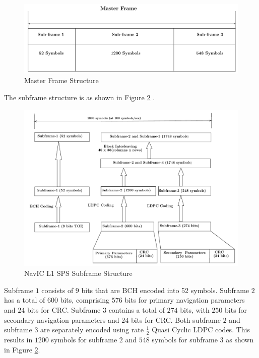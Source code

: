 \documentclass[conference]{IEEEtran}
\begin{document}
\begin{figure}[ht]
\centering
\includegraphics[width=1\columnwidth]{figs/master_frame}
\centering
\caption{Master Frame Structure}
\label{fig:master_frame}
\end{figure}

The subframe structure is as shown in Figure \ref{fig: SPS_Structure} \cite{b2}.
\begin{figure}[ht]
\centering
\includegraphics[width= 1\columnwidth]{figs/spsframe}
\centering
\caption{NavIC L1 SPS Subframe Structure}
\label{fig: SPS_Structure}
\end{figure}

Subframe $1$ consists of $9$ bits that are BCH encoded into 52 symbols. Subframe $2$ has 
a total of $600$ bits, comprising $576$ bits for primary navigation parameters and $24$ bits for CRC.
Subframe $3$ contains a total of $274$ bits, with $250$ bits for secondary navigation parameters and 
$24$ bits for CRC. Both subframe $2$ and subframe $3$ are separately encoded using rate $\frac{1}{2}$ 
Quasi Cyclic LDPC codes. This results in $1200$ symbols for subframe $2$ and $548$ symbols 
for subframe $3$ as shown in Figure \ref{fig: SPS_Structure}.
\end{document}
